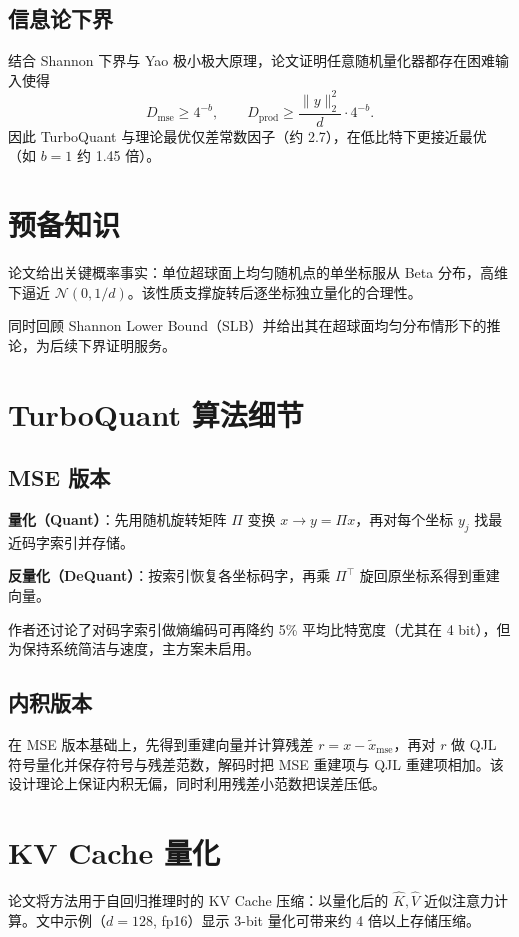 \documentclass[11pt]{ctexart}
\begin{document}
\subsection{信息论下界}
结合 Shannon 下界与 Yao 极小极大原理，论文证明任意随机量化器都存在困难输入使得
\[
D_{\text{mse}}\ge 4^{-b},\qquad
D_{\text{prod}}\ge \frac{\|y\|_2^2}{d}\cdot 4^{-b}.
\]
因此 TurboQuant 与理论最优仅差常数因子（约 2.7），在低比特下更接近最优（如 $b=1$ 约 1.45 倍）。

\section{预备知识}
论文给出关键概率事实：单位超球面上均匀随机点的单坐标服从 Beta 分布，高维下逼近 $\mathcal{N}(0,1/d)$。该性质支撑旋转后逐坐标独立量化的合理性。

同时回顾 Shannon Lower Bound（SLB）并给出其在超球面均匀分布情形下的推论，为后续下界证明服务。

\section{TurboQuant 算法细节}
\subsection{MSE 版本}
\textbf{量化（Quant）}：先用随机旋转矩阵 $\Pi$ 变换 $x\to y=\Pi x$，再对每个坐标 $y_j$ 找最近码字索引并存储。

\textbf{反量化（DeQuant）}：按索引恢复各坐标码字，再乘 $\Pi^\top$ 旋回原坐标系得到重建向量。

作者还讨论了对码字索引做熵编码可再降约 5\% 平均比特宽度（尤其在 4 bit），但为保持系统简洁与速度，主方案未启用。

\subsection{内积版本}
在 MSE 版本基础上，先得到重建向量并计算残差 $r=x-\tilde{x}_{\text{mse}}$，再对 $r$ 做 QJL 符号量化并保存符号与残差范数，解码时把 MSE 重建项与 QJL 重建项相加。该设计理论上保证内积无偏，同时利用残差小范数把误差压低。

\section{KV Cache 量化}
论文将方法用于自回归推理时的 KV Cache 压缩：以量化后的 $\hat{K},\hat{V}$ 近似注意力计算。文中示例（$d=128$, fp16）显示 3-bit 量化可带来约 4 倍以上存储压缩。
\end{document}

